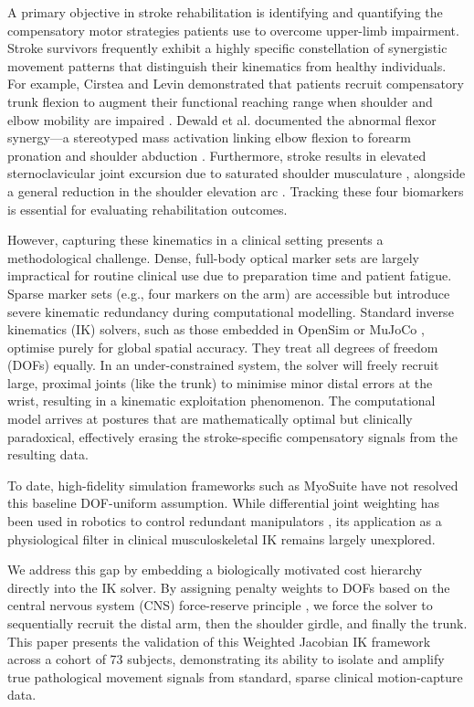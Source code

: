 \documentclass[12pt, a4paper]{article}
\begin{document}
A primary objective in stroke rehabilitation is identifying and quantifying the compensatory motor strategies patients use to overcome upper-limb impairment. Stroke survivors frequently exhibit a highly specific constellation of synergistic movement patterns that distinguish their kinematics from healthy individuals. For example, Cirstea and Levin demonstrated that patients recruit compensatory trunk flexion to augment their functional reaching range when shoulder and elbow mobility are impaired \cite{cirstea2000}. Dewald et al. documented the abnormal flexor synergy—a stereotyped mass activation linking elbow flexion to forearm pronation and shoulder abduction \cite{dewald1995}. Furthermore, stroke results in elevated sternoclavicular joint excursion due to saturated shoulder musculature \cite{mccrea2005}, alongside a general reduction in the shoulder elevation arc \cite{wagner2007}. Tracking these four biomarkers is essential for evaluating rehabilitation outcomes.

However, capturing these kinematics in a clinical setting presents a methodological challenge. Dense, full-body optical marker sets are largely impractical for routine clinical use due to preparation time and patient fatigue. Sparse marker sets (e.g., four markers on the arm) are accessible but introduce severe kinematic redundancy during computational modelling. Standard inverse kinematics (IK) solvers, such as those embedded in OpenSim \cite{delp2007} or MuJoCo \cite{todorov2012}, optimise purely for global spatial accuracy. They treat all degrees of freedom (DOFs) equally. In an under-constrained system, the solver will freely recruit large, proximal joints (like the trunk) to minimise minor distal errors at the wrist, resulting in a kinematic exploitation phenomenon. The computational model arrives at postures that are mathematically optimal but clinically paradoxical, effectively erasing the stroke-specific compensatory signals from the resulting data. 

To date, high-fidelity simulation frameworks such as MyoSuite \cite{caggiano2022} have not resolved this baseline DOF-uniform assumption. While differential joint weighting has been used in robotics to control redundant manipulators \cite{nakamura1987}, its application as a physiological filter in clinical musculoskeletal IK remains largely unexplored. 

We address this gap by embedding a biologically motivated cost hierarchy directly into the IK solver. By assigning penalty weights to DOFs based on the central nervous system (CNS) force-reserve principle \cite{cirstea2000}, we force the solver to sequentially recruit the distal arm, then the shoulder girdle, and finally the trunk. This paper presents the validation of this Weighted Jacobian IK framework across a cohort of 73 subjects, demonstrating its ability to isolate and amplify true pathological movement signals from standard, sparse clinical motion-capture data.
\end{document}
